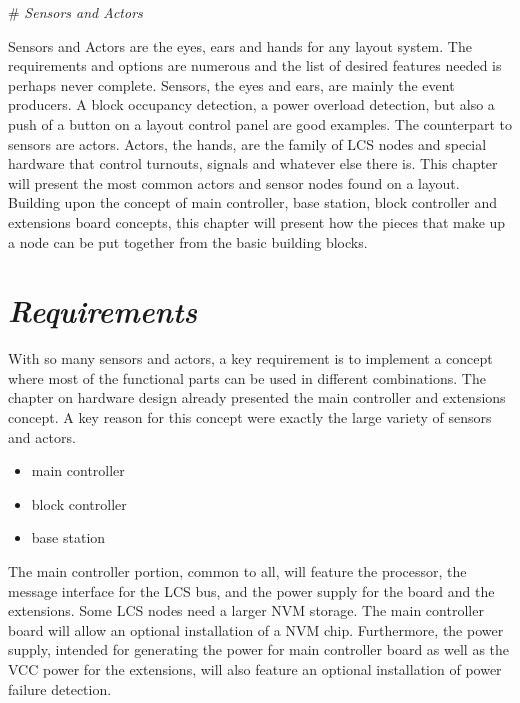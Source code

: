 # \textit{Sensors and Actors}

Sensors and Actors are the eyes, ears and hands for any layout system. The requirements and options are numerous and the list of desired features needed is perhaps never complete. Sensors, the eyes and ears, are mainly the event producers. A block occupancy detection, a power overload detection, but also a push of a button on a layout control panel are good examples. The counterpart to sensors  are actors. Actors, the hands, are the family of LCS nodes and special hardware that control turnouts, signals and whatever else there is. This chapter will present the most common actors and sensor nodes found on a layout. Building upon the concept of main controller, base station, block controller and extensions board concepts, this chapter will present how the pieces that make up a node can be put together from the basic building blocks.

\section{\textit{Requirements}}

With so many sensors and actors, a key requirement is to implement a concept where most of the functional parts can be used in different combinations. The chapter on hardware design already presented the main controller and extensions concept. A key reason for this concept were exactly the large variety of sensors and actors.
\begin{itemize}
\item main controller
\item block controller
\item base station
\end{itemize}

The main controller portion, common to all, will feature the processor, the message interface for the LCS bus, and the power supply for the board and the extensions. Some LCS nodes need a larger NVM storage. The main controller board will allow an optional installation of a NVM chip. Furthermore, the power supply, intended for generating the power for main controller board as well as the VCC power for the extensions, will also feature an optional installation of power failure detection.

